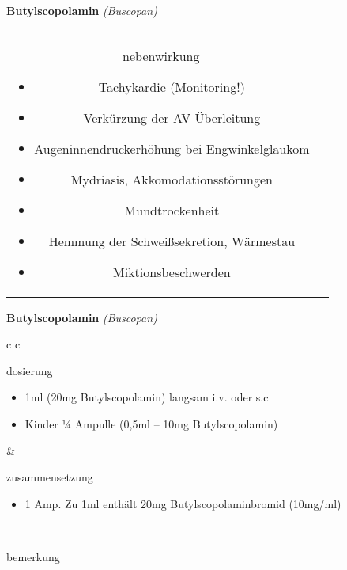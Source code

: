 \documentclass[12pt]{beamer}
\begin{document}
\begin{frame}{
    \textbf{Butylscopolamin}
    \textit{(Buscopan)}
}
\begin{tabular}{c c}
\begin{beamercolorbox}[wd=\boxwidth\textwidth,ht=\boxheight\textheight,sep=1em]{nebenwirkung}
            \begin{itemize}
                \item Tachykardie (Monitoring!)
                \item Verkürzung der AV Überleitung
                \item Augeninnendruckerhöhung bei Engwinkelglaukom
                \item Mydriasis, Akkomodationsstörungen
                \item Mundtrockenheit
                \item Hemmung der Schweißsekretion, Wärmestau
                \item Miktionsbeschwerden
            \end{itemize}
        \end{beamercolorbox} \\
    \end{tabular}
\end{frame}

\begin{frame}{
    \textbf{Butylscopolamin}
    \textit{(Buscopan)}
}
    \begin{tabular}{c c}
        \begin{beamercolorbox}[wd=\boxwidth\textwidth,ht=\boxheight\textheight,sep=1em]{dosierung}
            \begin{itemize}
                \item 1ml (20mg Butylscopolamin) langsam i.v. oder s.c
                \item Kinder ¼ Ampulle (0,5ml – 10mg Butylscopolamin)	
            \end{itemize}
        \end{beamercolorbox} & 
        \begin{beamercolorbox}[wd=\boxwidth\textwidth,ht=\boxheight\textheight,sep=1em]{zusammensetzung}
            \begin{itemize}
                \item 1 Amp. Zu 1ml enthält 20mg Butylscopolaminbromid (10mg/ml)
            \end{itemize}
        \end{beamercolorbox} \\
        \begin{beamercolorbox}[wd=\textwidth,ht=\boxheight\textheight,sep=1em]{bemerkung}
        \end{beamercolorbox} \\
    \end{tabular}
\end{frame}
\end{document}
